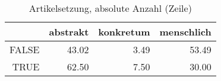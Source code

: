\begin{table}[ht]
\centering
\begin{tabular}{rrrr}
  \hline
 & abstrakt & konkretum & menschlich \\ 
  \hline
FALSE & 43.02 & 3.49 & 53.49 \\ 
  TRUE & 62.50 & 7.50 & 30.00 \\ 
   \hline
\end{tabular}
\caption{Artikelsetzung, absolute Anzahl (Zeile)} 
\end{table}
